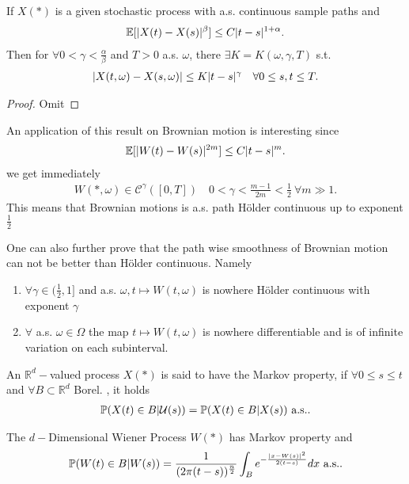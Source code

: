 \begin{theorem}
 If $X(*)$  is a given stochastic process with a.s. continuous sample paths and 
 \begin{align*}
   \E[\abs{X(t)-X(s)}^{\beta } ] \le  C \abs{t-s}^{1+\alpha } 
 .\end{align*}
 Then for $\forall 0 < \gamma  < \frac{\alpha }{\beta }$ and $T > 0$ a.s. $\omega$, there $\exists  K = K(\omega ,\gamma ,T)$ s.t.
 \begin{align*}
  \abs{X(t,\omega )-X(s,\omega )}\le K \abs{t-s}^{\gamma } \quad \forall  0 \le s, t \le T 
 .\end{align*}
\end{theorem}
\begin{proof}
 Omit 
\end{proof}
An application of this result on Brownian motion is interesting since 
\begin{align*}
  \E[\abs{W(t)-W(s)}^{2m} ] \le  C \abs{t-s}^{m}  
.\end{align*}
we get immediately 
\begin{align*}
  W(*,\omega ) \in  \mathcal{C}^{\gamma }([0,T])  \quad 0<\gamma <\frac{m-1}{2m} < \frac{1}{2} \ \forall  m \gg 1
.\end{align*}
This means that Brownian motions is a.s. path Hölder continuous up to exponent $\frac{1}{2}$
\begin{remark}
  One can also further prove that the path wise smoothness  of Brownian motion can not be better than Hölder  continuous. Namely 
  \begin{enumerate}
    \item $\forall  \gamma  \in  (\frac{1}{2},1]$  and a.s. $\omega , t \mapsto W(t,\omega )$ is nowhere Hölder  continuous with exponent $\gamma $
    \item $\forall $ a.s. $\omega  \in  \Omega $ the map $t \mapsto W(t,\omega )$ is nowhere differentiable and is of infinite variation on each subinterval.
  \end{enumerate}
\end{remark}
\begin{definition}
 An $\mathbb{R}^{d}-$valued process $X(*)$ is said to have the Markov property, if $\forall  0\le s\le t$ and 
 $\forall B \subset  \mathbb{R}^{d} $ Borel. , it holds 
 \begin{align*}
   \P(X(t) \in  B | \mathcal{U}(s)) = \P(X(t) \in  B | X(s)) \text{ a.s.}
 .\end{align*}
\end{definition}
\begin{remark}
 The $d-$Dimensional Wiener Process $W(*)$  has Markov property and 
 \begin{align*}
  \P(W(t)\in B | W(s)) = \frac{1}{(2\pi(t-s))^{\frac{n}{2}} } \int_B e^{-\frac{\abs{x - W(s)}^2}{2(t-s)}}  dx \text{ a.s.}
 .\end{align*}
\end{remark}
